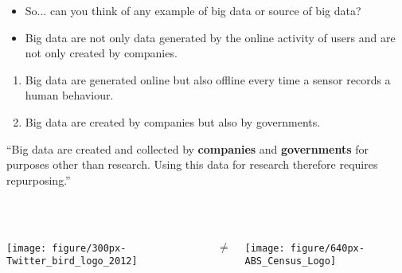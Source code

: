 \documentclass[serif, aspectratio=169]{beamer}
\begin{document}
\begin{frame}

\begin{itemize}

\item<1> So... can you think of any example of big data or source of big data? 

\end{itemize}

\begin{itemize}

\item<2-> Big data are not only data generated by the online activity of users and are not only created by companies. 

\end{itemize}

\begin{enumerate}

\item<3-> Big data are generated online but also offline every time a sensor records a human behaviour. 

\item<4-> Big data are created by companies but also by governments.

\end{enumerate}

\end{frame}


\begin{frame}

\enquote{Big data are created and collected by \textbf{companies} and \textbf{governments} for purposes other than research. Using this data for research therefore requires repurposing.} \autocite[14]{salganik_bit_2018}\\~\ \\~\
\begin{columns}
\begin{column}{0.4\textwidth}
\centering\texttt{[image: figure/300px-Twitter\_bird\_logo\_2012]}
\end{column}

\begin{column}{0.2\textwidth}
\LARGE\centering$\neq$
\end{column}

\begin{column}{0.4\textwidth}
\centering\texttt{[image: figure/640px-ABS\_Census\_Logo]}
\end{column}

\end{columns}

\end{frame}
\end{document}

